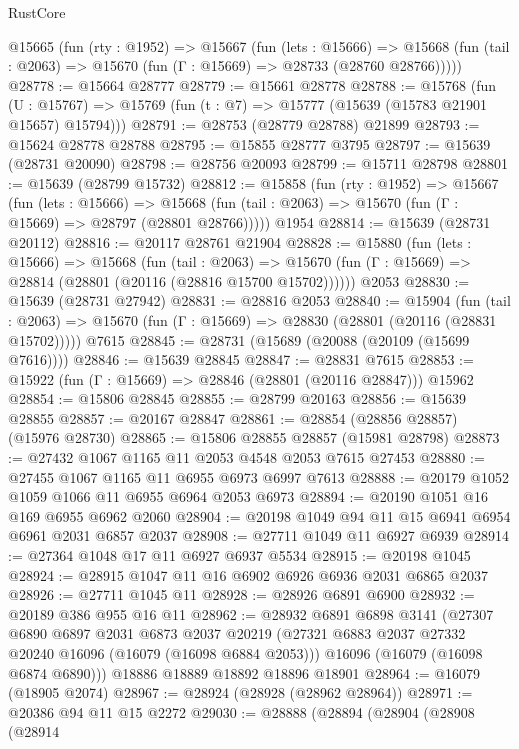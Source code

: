 \begin{lexlean}{RustCore}
\begin{coremodule}
  @15665
    (fun (rty : @1952) =>
    @15667
      (fun (lets : @15666) =>
      @15668 (fun (tail : @2063) => @15670 (fun (Γ : @15669) => @28733 (@28760 @28766)))))
@28778 := @15664 @28777
@28779 := @15661 @28778
@28788 := @15768
    (fun (U : @15767) => @15769 (fun (t : @7) => @15777 (@15639 (@15783 @21901 @15657) @15794)))
@28791 := @28753 (@28779 @28788) @21899
@28793 := @15624 @28778 @28788
@28795 := @15855 @28777 @3795
@28797 := @15639 (@28731 @20090)
@28798 := @28756 @20093
@28799 := @15711 @28798
@28801 := @15639 (@28799 @15732)
@28812 := @15858
    (fun (rty : @1952) =>
    @15667
      (fun (lets : @15666) =>
      @15668 (fun (tail : @2063) => @15670 (fun (Γ : @15669) => @28797 (@28801 @28766)))))
    @1954
@28814 := @15639 (@28731 @20112)
@28816 := @20117 @28761 @21904
@28828 := @15880
    (fun (lets : @15666) =>
    @15668
      (fun (tail : @2063) =>
      @15670 (fun (Γ : @15669) => @28814 (@28801 (@20116 (@28816 @15700 @15702))))))
    @2053
@28830 := @15639 (@28731 @27942)
@28831 := @28816 @2053
@28840 := @15904
    (fun (tail : @2063) => @15670 (fun (Γ : @15669) => @28830 (@28801 (@20116 (@28831 @15702)))))
    @7615
@28845 := @28731 (@15689 (@20088 (@20109 (@15699 @7616))))
@28846 := @15639 @28845
@28847 := @28831 @7615
@28853 := @15922 (fun (Γ : @15669) => @28846 (@28801 (@20116 @28847))) @15962
@28854 := @15806 @28845
@28855 := @28799 @20163
@28856 := @15639 @28855
@28857 := @20167 @28847
@28861 := @28854 (@28856 @28857) (@15976 @28730)
@28865 := @15806 @28855 @28857 (@15981 @28798)
@28873 := @27432 @1067 @1165 @11 @2053 @4548 @2053 @7615 @27453
@28880 := @27455 @1067 @1165 @11 @6955 @6973 @6997 @7613
@28888 := @20179 @1052 @1059 @1066 @11 @6955 @6964 @2053 @6973
@28894 := @20190 @1051 @16 @169 @6955 @6962 @2060
@28904 := @20198 @1049 @94 @11 @15 @6941 @6954 @6961 @2031 @6857 @2037
@28908 := @27711 @1049 @11 @6927 @6939
@28914 := @27364 @1048 @17 @11 @6927 @6937 @5534
@28915 := @20198 @1045
@28924 := @28915 @1047 @11 @16 @6902 @6926 @6936 @2031 @6865 @2037
@28926 := @27711 @1045 @11
@28928 := @28926 @6891 @6900
@28932 := @20189 @386 @955 @16 @11
@28962 := @28932
    @6891
    @6898
    @3141
    (@27307
      @6890
      @6897
      @2031
      @6873
      @2037
      @20219
      (@27321 @6883 @2037 @27332 @20240 @16096 (@16079 (@16098 @6884 @2053)))
      @16096
      (@16079 (@16098 @6874 @6890)))
    @18886
    @18889
    @18892
    @18896
    @18901
@28964 := @16079 (@18905 @2074)
@28967 := @28924 (@28928 (@28962 @28964))
@28971 := @20386 @94 @11 @15 @2272
@29030 := @28888
    (@28894
      (@28904
        (@28908
          (@28914

\end{coremodule}
\end{lexlean}
